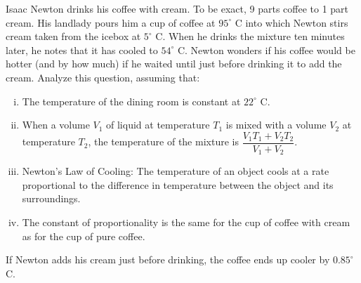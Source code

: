 \begin{question}[1997H]
Isaac Newton drinks his coffee with cream. To be exact, 9 parts coffee
to 1 part cream. His landlady pours him a cup of coffee at
$95^\circ$ C into which Newton stirs cream taken from the icebox at $5^\circ$ C.
When he drinks the mixture ten minutes later, he notes that it has cooled
to $54^\circ$ C.
 Newton wonders if his coffee would be hotter (and by how much) if he
waited until just before drinking it to add the cream. Analyze this question,
assuming that:
\begin{enumerate}[(i)]
\item The temperature of the dining room is constant at $22^\circ$ C.
\item When a volume $V_1$ of liquid at temperature $T_1$ is mixed
with a volume $V_2$ at temperature $T_2$, the temperature of the mixture
is $\dfrac{V_1T_1+V_2T_2}{V_1+V_2}$.
\item Newton's Law of Cooling: The temperature of an object
cools at a rate proportional to the difference in temperature between the
object and its surroundings.
\item The constant of proportionality is the same for the cup
of coffee with cream as for the cup of pure coffee.
\end{enumerate}
\end{question}
\begin{answer}
If Newton adds his cream just before drinking, the coffee
ends up {cooler by $0.85^\circ$ C}.
\end{answer}
